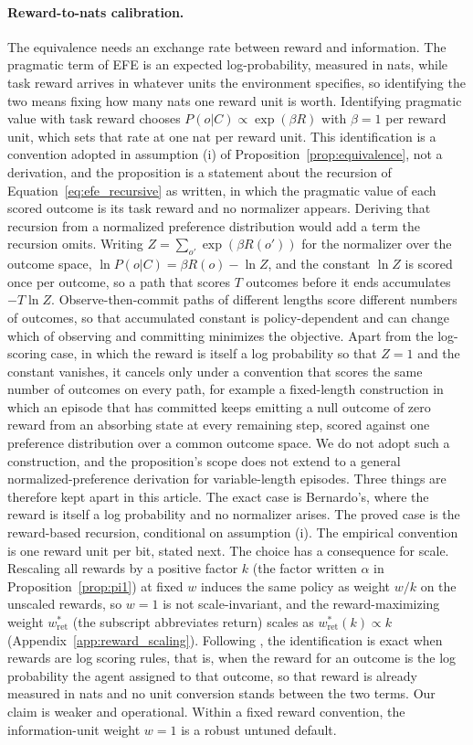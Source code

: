 \paragraph{Reward-to-nats calibration.}
The equivalence needs an exchange rate between reward and information. The pragmatic term of EFE is an expected log-probability, measured in nats, while task reward arrives in whatever units the environment specifies, so identifying the two means fixing how many nats one reward unit is worth. Identifying pragmatic value with task reward chooses $P(o|C) \propto \exp(\beta R)$ with $\beta{=}1$ per reward unit, which sets that rate at one nat per reward unit. This identification is a convention adopted in assumption (i) of Proposition~\ref{prop:equivalence}, not a derivation, and the proposition is a statement about the recursion of Equation~\ref{eq:efe_recursive} as written, in which the pragmatic value of each scored outcome is its task reward and no normalizer appears. Deriving that recursion from a normalized preference distribution would add a term the recursion omits. Writing $Z = \sum_{o'} \exp(\beta R(o'))$ for the normalizer over the outcome space, $\ln P(o|C) = \beta R(o) - \ln Z$, and the constant $\ln Z$ is scored once per outcome, so a path that scores $T$ outcomes before it ends accumulates $-T \ln Z$. Observe-then-commit paths of different lengths score different numbers of outcomes, so that accumulated constant is policy-dependent and can change which of observing and committing minimizes the objective. Apart from the log-scoring case, in which the reward is itself a log probability so that $Z{=}1$ and the constant vanishes, it cancels only under a convention that scores the same number of outcomes on every path, for example a fixed-length construction in which an episode that has committed keeps emitting a null outcome of zero reward from an absorbing state at every remaining step, scored against one preference distribution over a common outcome space. We do not adopt such a construction, and the proposition's scope does not extend to a general normalized-preference derivation for variable-length episodes. Three things are therefore kept apart in this article. The exact case is Bernardo's, where the reward is itself a log probability and no normalizer arises. The proved case is the reward-based recursion, conditional on assumption (i). The empirical convention is one reward unit per bit, stated next. The choice has a consequence for scale. Rescaling all rewards by a positive factor $k$ (the factor written $\alpha$ in Proposition~\ref{prop:pi1}) at fixed $w$ induces the same policy as weight $w/k$ on the unscaled rewards, so $w{=}1$ is not scale-invariant, and the reward-maximizing weight $w^*_{\mathrm{ret}}$ (the subscript abbreviates return) scales as $w^*_{\mathrm{ret}}(k)\propto k$ (Appendix~\ref{app:reward_scaling}). Following \citet{bernardo1979}, the identification is exact when rewards are log scoring rules, that is, when the reward for an outcome is the log probability the agent assigned to that outcome, so that reward is already measured in nats and no unit conversion stands between the two terms. Our claim is weaker and operational. Within a fixed reward convention, the information-unit weight $w{=}1$ is a robust untuned default.

